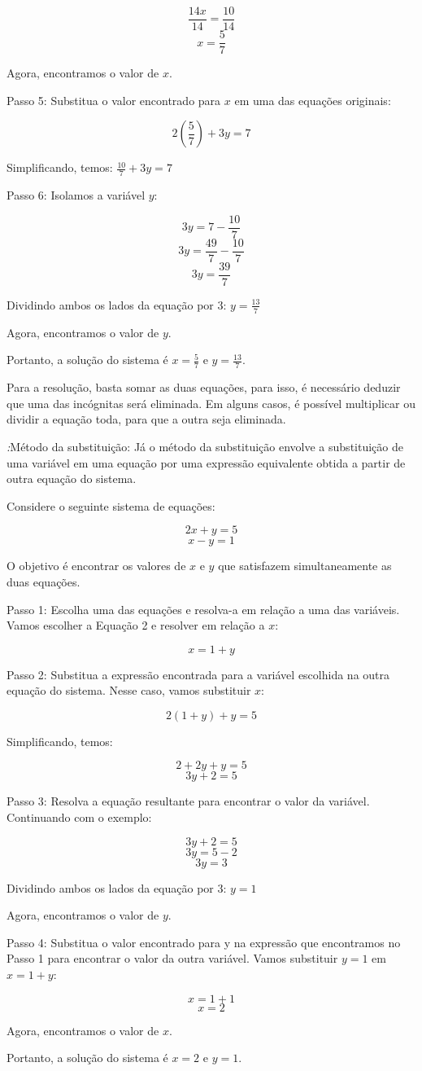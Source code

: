 {$$\frac {14x}{14} = \frac {10}{14}$$
$$x = \frac {5}{7}$$

Agora, encontramos o valor de $x$.

Passo 5: Substitua o valor encontrado para $x$ em uma das equações
originais:

$$2\left(\frac {5}{7}\right) + 3y = 7$$

Simplificando, temos: $\frac {10}{7} + 3y = 7$

Passo 6: Isolamos a variável $y$:

$$3y = 7 - \frac {10}{7}$$
$$3y = \frac {49}{7} - \frac {10}{7}$$
$$3y = \frac {39}{7}$$

Dividindo ambos os lados da equação por 3: $y = \frac {13}{7}$

Agora, encontramos o valor de $y$.

Portanto, a solução do sistema é $x = \frac {5}{7}$ e $y = \frac {13}{7}$.

Para a resolução, basta somar as duas equações, para isso, é necessário
deduzir que uma das incógnitas será eliminada. Em alguns casos, é
possível multiplicar ou dividir a equação toda, para que a outra seja
eliminada.

\textit:{Método da substituição:}
Já o método da substituição envolve a substituição de uma variável em
uma equação por uma expressão equivalente obtida a partir de outra
equação do sistema.

Considere o seguinte sistema de equações: 

$$2x + y = 5 $$
$$x - y = 1$$

O objetivo é encontrar os valores de $x$ e $y$ que satisfazem
simultaneamente as duas equações.

Passo 1: Escolha uma das equações e resolva-a em relação a uma das
variáveis. Vamos escolher a Equação 2 e resolver em relação a $x$:

$$x = 1 + y$$

Passo 2: Substitua a expressão encontrada para a variável escolhida na
outra equação do sistema. Nesse caso, vamos substituir $x$:

$$2(1 + y) + y = 5$$

Simplificando, temos: 

$$2 + 2y + y = 5$$
$$3y + 2 = 5$$

Passo 3: Resolva a equação resultante para encontrar o valor da
variável. Continuando com o exemplo:

$$3y + 2 = 5$$
$$3y = 5 - 2$$
$$3y = 3$$

Dividindo ambos os lados da equação por 3: $y = 1$

Agora, encontramos o valor de $y$.

Passo 4: Substitua o valor encontrado para y na expressão que
encontramos no Passo 1 para encontrar o valor da outra variável. Vamos
substituir $y = 1$ em $x = 1 + y$:

$$x = 1 + 1$$
$$x = 2$$

Agora, encontramos o valor de $x$.

Portanto, a solução do sistema é $x = 2$ e $y = 1$.
}



